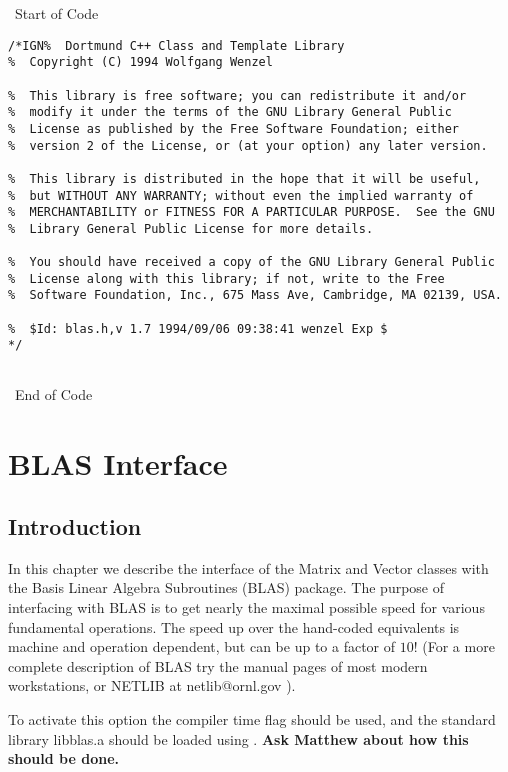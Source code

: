 \newpage 
{}

\vspace{0.1em} \small 
{\ \hrulefill Start of Code \hrulefill} 
\begin{verbatim} 
/*IGN%  Dortmund C++ Class and Template Library 
%  Copyright (C) 1994 Wolfgang Wenzel

%  This library is free software; you can redistribute it and/or
%  modify it under the terms of the GNU Library General Public
%  License as published by the Free Software Foundation; either
%  version 2 of the License, or (at your option) any later version.

%  This library is distributed in the hope that it will be useful,
%  but WITHOUT ANY WARRANTY; without even the implied warranty of
%  MERCHANTABILITY or FITNESS FOR A PARTICULAR PURPOSE.  See the GNU
%  Library General Public License for more details.

%  You should have received a copy of the GNU Library General Public
%  License along with this library; if not, write to the Free
%  Software Foundation, Inc., 675 Mass Ave, Cambridge, MA 02139, USA.
  
%  $Id: blas.h,v 1.7 1994/09/06 09:38:41 wenzel Exp $
*/


\end{verbatim} 
{\ \hrulefill End of Code \hrulefill} \ \normalsize
 
\chapter{BLAS Interface}

\section{Introduction}

In this chapter we describe the interface of the Matrix and Vector
classes with the Basis Linear Algebra Subroutines (BLAS) package.  The
purpose of interfacing with BLAS is to get nearly the maximal possible
speed for various fundamental operations.  The speed up over the
hand-coded equivalents is machine and operation dependent, but can be
up to a factor of $10$!  (For a more complete description of BLAS try
the manual pages of most modern workstations, or NETLIB at
netlib@ornl.gov ).

To activate this option the compiler time flag  should be
used, and the standard library libblas.a should be loaded using
.  {\bf Ask Matthew about how this should be done.}

